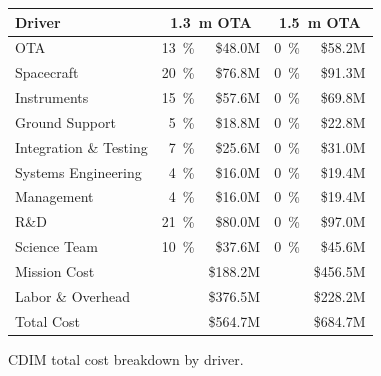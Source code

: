 \documentclass{ws-jai}
\begin{document}
\begin{wstable}[htp]
  \centering
  \begin{tabular}{@{}lrrrr@{}}\toprule
    Driver                 & \multicolumn{2}{c}{\SI{1.3}{\meter} OTA} & \multicolumn{2}{c}{\SI{1.5}{\meter} OTA} \\ \midrule
    OTA                    & \SI{13}{\percent}     & \$48.0M      & \SI{0}{\percent}      & \$58.2M      \\
    Spacecraft             & \SI{20}{\percent}     & \$76.8M      & \SI{0}{\percent}      & \$91.3M      \\
    Instruments            & \SI{15}{\percent}     & \$57.6M      & \SI{0}{\percent}      & \$69.8M      \\
    Ground Support         & \SI{5}{\percent}      & \$18.8M      & \SI{0}{\percent}      & \$22.8M      \\
    Integration \& Testing & \SI{7}{\percent}      & \$25.6M      & \SI{0}{\percent}      & \$31.0M      \\
    Systems Engineering    & \SI{4}{\percent}      & \$16.0M      & \SI{0}{\percent}      & \$19.4M      \\
    Management             & \SI{4}{\percent}      & \$16.0M      & \SI{0}{\percent}      & \$19.4M      \\
    R\&D                   & \SI{21}{\percent}     & \$80.0M      & \SI{0}{\percent}      & \$97.0M      \\
    Science Team           & \SI{10}{\percent}     & \$37.6M      & \SI{0}{\percent}      & \$45.6M      \\ \midrule
    Mission Cost           &                       & \$188.2M     &                       & \$456.5M     \\
    Labor \& Overhead      &                       & \$376.5M     &                       & \$228.2M     \\
    Total Cost             &                       & \$564.7M     &                       & \$684.7M     \\ \bottomrule
  \end{tabular}
  \caption{CDIM total cost breakdown by driver. 
\label{tab:total-cost}
}
\end{wstable}
\end{document}
